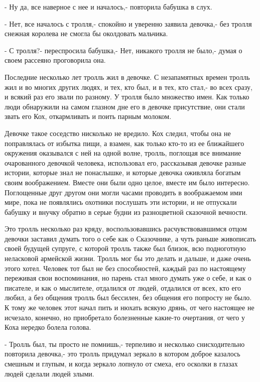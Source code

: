 - Ну да, все наверное с нее и началось,- повторила бабушка в слух.

- Нет, все началось с тролля,- спокойно и уверенно заявила девочка,- без тролля
снежная королева не смогла бы околдовать мальчика.

- С тролля?- переспросила бабушка,- Нет, никакого тролля не было,- думая о
своем рассеяно проговорила она.

Последние несколько лет тролль жил в девочке. С незапамятных времен тролль
жил и во многих других людях, и тех, кто был, и в тех, кто стал,- во всех
сразу, и всякий раз его звали по разному. У тролля было множество имен. Как
только люди обнаружили на самом глазном дне его в девочке присутствие, они
стали звать его Кох, откармливать и поить парным молоком.

Девочке такое соседство нисколько не вредило. Кох следил, чтобы она не
поправлялась от избытка пищи, а взамен, как только кто-то из ее ближайшего
окружения оказывался с ней на одной волне, тролль, поглощая все внимание
очарованного девочкой человека, использовал его, рассказывая девочке разные
истории, которые знал не понаслышке, и которые девочка оживляла богатым
своим воображением. Вместе они были одно целое, вместе им было интересно.
Поглощенные друг другом они могли часами проводить в воображаемом ими мире,
пока не появлялись охотники послушать эти истории, и не отпускали бабушку и
внучку обратно в серые будни из разноцветной сказочной вечности.

Это тролль несколько раз кряду, воспользовавшись расчувствовавшимся отцом
девочки заставил думать того о себе как о Сказочнике, а чуть раньше
живописать своей будущей супруге, с которой тролль также был близок, всю
подноготную неласковой армейской жизни. Тролль мог бы это делать и дальше, и
даже очень этого хотел. Человек тот был не без способностей, каждый раз по
настоящему переживая свои воспоминания, но парень стал много думать уже о
себе, и как о писателе, и как о мыслителе, отдалился от людей, отдалился от
всех, кто его любил, а без общения тролль был бессилен, без общения его
попросту не было. К тому же человек этот начал пить и нюхать всякую дрянь,
от чего настоящее не исчезало, конечно, но приобретало болезненные какие-то
очертания, от чего у Коха нередко болела голова.

- Тролль был, ты просто не помнишь,- терпеливо и несколько снисходительно
повторила девочка,- это тролль придумал зеркало в котором доброе казалось
смешным и глупым, и когда зеркало лопнуло от смеха, его осколки в глазах людей
сделали людей злыми.

